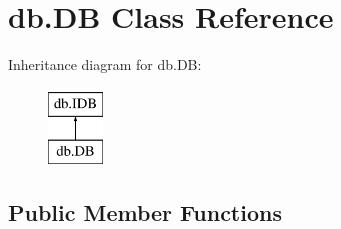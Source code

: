 \hypertarget{classdb_1_1_d_b}{}\section{db.\+DB Class Reference}
\label{classdb_1_1_d_b}
Inheritance diagram for db.\+DB\+:\begin{figure}[H]
\begin{center}
\leavevmode
\includegraphics[height=2.000000cm]{classdb_1_1_d_b}
\end{center}
\end{figure}
\subsection*{Public Member Functions}
